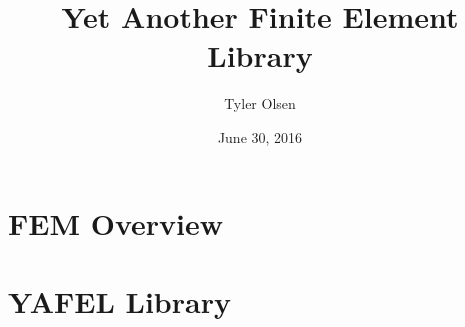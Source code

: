 \documentclass{beamer}
\title[YAFEL]{Yet Another Finite Element Library}
\author{Tyler Olsen}
\date{June 30, 2016}
\begin{document}
\begin{frame}
  \titlepage
\end{frame}

\section{FEM Overview}


\section{YAFEL Library}

\end{document}

